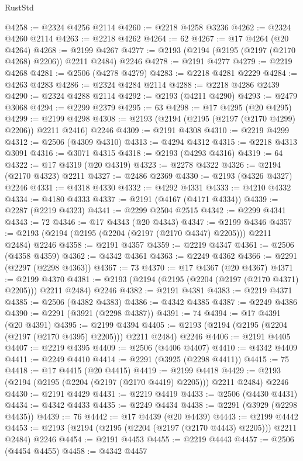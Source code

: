 \begin{lexlean}{RustStd}
\begin{coremodule}
@4258 := @2324 @4256 @2114
@4260 := @2218 @4258 @3236
@4262 := @2324 @4260 @2114
@4263 := @2218 @4262
@4264 := 62
@4267 := @17 @4264 (@20 @4264)
@4268 := @2199 @4267
@4277 := @2193 (@2194 (@2195 (@2197 (@2170 @4268) @2206)) @2211 @2484) @2246
@4278 := @2191 @4277
@4279 := @2219 @4268
@4281 := @2506 (@4278 @4279)
@4283 := @2218 @4281 @2229
@4284 := @4263 @4283
@4286 := @2324 @4284 @2114
@4288 := @2218 @4286 @2439
@4290 := @2324 @4288 @2114
@4292 := @2193 (@4211 @4290)
@4293 := @2479 @3068
@4294 := @2299 @2379
@4295 := 63
@4298 := @17 @4295 (@20 @4295)
@4299 := @2199 @4298
@4308 := @2193 (@2194 (@2195 (@2197 (@2170 @4299) @2206)) @2211 @2416) @2246
@4309 := @2191 @4308
@4310 := @2219 @4299
@4312 := @2506 (@4309 @4310)
@4313 := @4294 @4312
@4315 := @2218 @4313 @3091
@4316 := @3071 @4315
@4318 := @2193 (@4293 @4316)
@4319 := 64
@4322 := @17 @4319 (@20 @4319)
@4323 := @2278 @4322
@4326 := @2194 (@2170 @4323) @2211
@4327 := @2486 @2369
@4330 := @2193 (@4326 @4327) @2246
@4331 := @4318 @4330
@4332 := @4292 @4331
@4333 := @4210 @4332
@4334 := @4180 @4333
@4337 := @2191 (@4167 (@4171 @4334))
@4339 := @2287 (@2219 @4323)
@4341 := @2299 @2504 @2515
@4342 := @2299 @4341
@4343 := 72
@4346 := @17 @4343 (@20 @4343)
@4347 := @2199 @4346
@4357 := @2193 (@2194 (@2195 (@2204 (@2197 (@2170 @4347) @2205))) @2211 @2484) @2246
@4358 := @2191 @4357
@4359 := @2219 @4347
@4361 := @2506 (@4358 @4359)
@4362 := @4342 @4361
@4363 := @2249 @4362
@4366 := @2291 (@2297 (@2298 @4363))
@4367 := 73
@4370 := @17 @4367 (@20 @4367)
@4371 := @2199 @4370
@4381 := @2193 (@2194 (@2195 (@2204 (@2197 (@2170 @4371) @2205))) @2211 @2484) @2246
@4382 := @2191 @4381
@4383 := @2219 @4371
@4385 := @2506 (@4382 @4383)
@4386 := @4342 @4385
@4387 := @2249 @4386
@4390 := @2291 (@3921 (@2298 @4387))
@4391 := 74
@4394 := @17 @4391 (@20 @4391)
@4395 := @2199 @4394
@4405 := @2193 (@2194 (@2195 (@2204 (@2197 (@2170 @4395) @2205))) @2211 @2484) @2246
@4406 := @2191 @4405
@4407 := @2219 @4395
@4409 := @2506 (@4406 @4407)
@4410 := @4342 @4409
@4411 := @2249 @4410
@4414 := @2291 (@3925 (@2298 @4411))
@4415 := 75
@4418 := @17 @4415 (@20 @4415)
@4419 := @2199 @4418
@4429 := @2193 (@2194 (@2195 (@2204 (@2197 (@2170 @4419) @2205))) @2211 @2484) @2246
@4430 := @2191 @4429
@4431 := @2219 @4419
@4433 := @2506 (@4430 @4431)
@4434 := @4342 @4433
@4435 := @2249 @4434
@4438 := @2291 (@3929 (@2298 @4435))
@4439 := 76
@4442 := @17 @4439 (@20 @4439)
@4443 := @2199 @4442
@4453 := @2193 (@2194 (@2195 (@2204 (@2197 (@2170 @4443) @2205))) @2211 @2484) @2246
@4454 := @2191 @4453
@4455 := @2219 @4443
@4457 := @2506 (@4454 @4455)
@4458 := @4342 @4457

\end{coremodule}
\end{lexlean}

